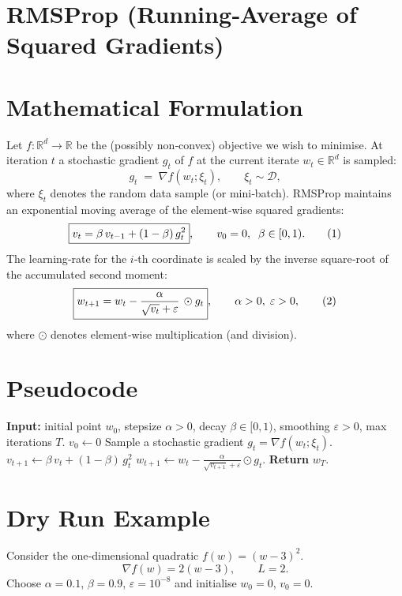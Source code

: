 \documentclass{article}
\begin{document}
\section*{RMSProp (Running‑Average of Squared Gradients)}

\section*{Mathematical Formulation}
Let $f:\mathbb{R}^{d}\rightarrow\mathbb{R}$ be the (possibly non‑convex) objective we wish to minimise.
At iteration $t$ a stochastic gradient $g_{t}$ of $f$ at the current iterate $w_{t}\in\mathbb{R}^{d}$ is sampled:
\[
g_{t}\;=\;\nabla f(w_{t};\xi_{t}),\qquad \xi_{t}\sim\mathcal{D},
\]
where $\xi_{t}$ denotes the random data sample (or mini‑batch).  
RMSProp maintains an exponential moving average of the element‑wise squared gradients:
\[
\boxed{%
v_{t}= \beta\,v_{t-1} + (1-\beta)\, g_{t}^{2}},\qquad v_{0}=0,\;\; \beta\in[0,1) .
\tag{1}
\]
The learning‑rate for the $i$‑th coordinate is scaled by the inverse square‑root of the accumulated second moment:
\[
\boxed{%
w_{t+1}= w_{t} - \frac{\alpha}{\sqrt{v_{t}}+\varepsilon}\,\odot g_{t}},\qquad
\alpha>0,\;\varepsilon>0 ,
\tag{2}
\]
where $\odot$ denotes element‑wise multiplication (and division).

\section*{Pseudocode}
\begin{algorithm}[H]
\caption{RMSProp}
\begin{algorithmic}[1]
\STATE \textbf{Input:} initial point $w_{0}$, stepsize $\alpha>0$, decay $\beta\in[0,1)$, smoothing $\varepsilon>0$, max iterations $T$.
\STATE $v_{0}\gets 0$ 
    \STATE Sample a stochastic gradient $g_{t}= \nabla f(w_{t};\xi_{t})$.
    \STATE $v_{t+1}\gets \beta\,v_{t}+(1-\beta)\,g_{t}^{2}$ \hfill{}
    \STATE $w_{t+1}\gets w_{t}-\displaystyle\frac{\alpha}{\sqrt{v_{t+1}}+\varepsilon}\odot g_{t}$.
\ENDFOR
\STATE \textbf{Return} $w_{T}$.
\end{algorithmic}
\end{algorithm}

\section*{Dry Run Example}
Consider the one‑dimensional quadratic $f(w)=(w-3)^{2}$.
\[
\nabla f(w)=2(w-3),\qquad L=2.
\]
Choose $\alpha=0.1$, $\beta=0.9$, $\varepsilon=10^{-8}$ and initialise $w_{0}=0$, $v_{0}=0$.
\end{document}
